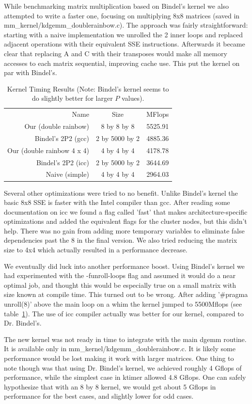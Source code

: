 \documentclass{article}
\begin{document}
While benchmarking matrix multiplication based on Bindel's kernel we also attempted to write a faster one, 
focusing on multiplying 8x8 matrices (saved in mm\_kernel/kdgemm\_doublerainbow.c). The approach was fairly straightforward: starting with a 
naive implementation we unrolled the 2 inner loops and replaced adjacent operations with their equivalent SSE instructions. 
Afterwards it became clear that replacing A and C with their transposes would make all memory accesses to each matrix sequential,
improving cache use. This put the kernel on par with Bindel's.
\begin{table}[h]
  \centering
  \begin{tabular}{r c c}
    Name & Size & MFlops\\
    Our (double rainbow) & 8 by 8 by 8 & 5525.91 \\
    Bindel's 2P2 (gcc) & 2 by 5000 by 2 & 4885.36 \\
    Our (double rainbow 4 x 4) & 4 by 4 by 4 & 4178.78 \\
    Bindel's 2P2 (icc) & 2 by 5000 by 2 & 3644.69 \\
    Naive (simple) & 4 by 4 by 4& 2964.03
  \end{tabular}
  \caption{Kernel Timing Results (Note: Bindel's kernel seems to do slightly better for larger $P$ values).}
  \label{tab:kernel}
\end{table}
Several other optimizations were tried to no benefit. 
Unlike Bindel's kernel the basic 8x8 SSE is faster with the Intel compiler than gcc. 
After reading some documentation on icc we found a flag called 'fast' that makes architecture-specific optimizations 
and added the equivalent flags for the cluster nodes, but this didn't help. There was no gain from adding more temporary variables
to eliminate false dependencies past the 8 in the final version. We also tried reducing the matrix size to 4x4 which actually resulted in a performance decrease.

We eventually did luck into another performance boost. Using Bindel's kernel we had experimented with the -funroll-loops
flag and assumed it would do a near optimal job, and thought this would be especially true on a small matrix with size known at compile time.
This turned out to be wrong. After adding '\#pragma unroll(8)' above the main loop on a whim the kernel jumped to 5500Mflops (see table~\ref{tab:kernel}).
The use of icc compiler actually was better for our kernel, compared to Dr. Bindel's.

The new kernel was not ready in time to integrate with the main dgemm routine. It is available only in mm\_kernel/kdgemm\_doublerainbow.c. 
It is likely some performance would be lost making it work with larger matrices. One thing to note though was that using Dr. Bindel's
kernel, we achieved roughly 4 Gflops of performance, while the simplest case in ktimer allowed 4.8 Gflops. One can safely hypothesize that
with an 8 by 8 kernel, we would get about 5 Gflops in performance for the best cases, and slightly lower for odd cases.
\end{document}
